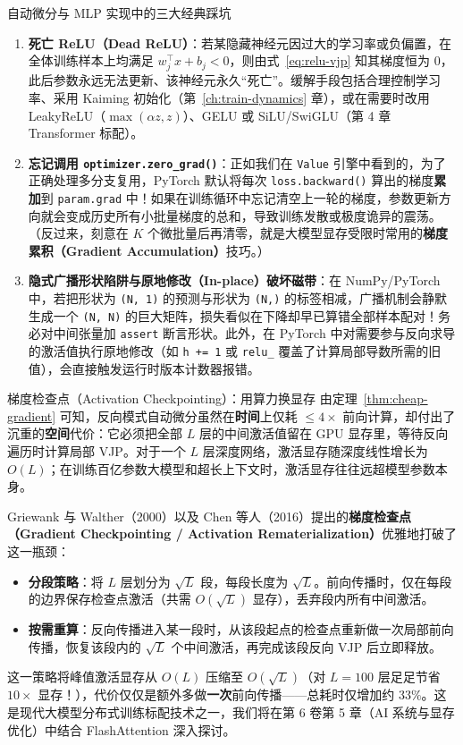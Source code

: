 \begin{failBox}{自动微分与 MLP 实现中的三大经典踩坑}
\begin{enumerate}
  \item \textbf{死亡 ReLU（Dead ReLU）}：若某隐藏神经元因过大的学习率或负偏置，在全体训练样本上均满足 $w_j^\top x + b_j < 0$，则由式~\eqref{eq:relu-vjp} 知其梯度恒为 $0$，此后参数永远无法更新、该神经元永久“死亡”。缓解手段包括合理控制学习率、采用 Kaiming 初始化（第~\ref{ch:train-dynamics} 章），或在需要时改用 LeakyReLU（$\max(\alpha z, z)$）、GELU 或 SiLU/SwiGLU（第 4 章 Transformer 标配）。
  \item \textbf{忘记调用 \texttt{optimizer.zero\_grad()}}：正如我们在 \texttt{Value} 引擎中看到的，为了正确处理多分支复用，PyTorch 默认将每次 \texttt{loss.backward()} 算出的梯度\textbf{累加}到 \texttt{param.grad} 中！如果在训练循环中忘记清空上一轮的梯度，参数更新方向就会变成历史所有小批量梯度的总和，导致训练发散或极度诡异的震荡。（反过来，刻意在 $K$ 个微批量后再清零，就是大模型显存受限时常用的\textbf{梯度累积（Gradient Accumulation）}技巧。）
  \item \textbf{隐式广播形状陷阱与原地修改（In-place）破坏磁带}：在 NumPy/PyTorch 中，若把形状为 \texttt{(N, 1)} 的预测与形状为 \texttt{(N,)} 的标签相减，广播机制会静默生成一个 \texttt{(N, N)} 的巨大矩阵，损失看似在下降却早已算错全部样本配对！务必对中间张量加 \texttt{assert} 断言形状。此外，在 PyTorch 中对需要参与反向求导的激活值执行原地修改（如 \texttt{h += 1} 或 \texttt{relu\_} 覆盖了计算局部导数所需的旧值），会直接触发运行时版本计数器报错。
\end{enumerate}
\end{failBox}

\begin{extBox}{梯度检查点（Activation Checkpointing）：用算力换显存}
由定理~\ref{thm:cheap-gradient} 可知，反向模式自动微分虽然在\textbf{时间}上仅耗 $\le 4\times$ 前向计算，却付出了沉重的\textbf{空间}代价：它必须把全部 $L$ 层的中间激活值留在 GPU 显存里，等待反向遍历时计算局部 VJP。对于一个 $L$ 层深度网络，激活显存随深度线性增长为 $O(L)$；在训练百亿参数大模型和超长上下文时，激活显存往往远超模型参数本身。

Griewank 与 Walther（2000）以及 Chen 等人（2016）提出的\textbf{梯度检查点（Gradient Checkpointing / Activation Rematerialization）}优雅地打破了这一瓶颈：
\begin{itemize}
  \item \textbf{分段策略}：将 $L$ 层划分为 $\sqrt{L}$ 段，每段长度为 $\sqrt{L}$。前向传播时，仅在每段的边界保存检查点激活（共需 $O(\sqrt{L})$ 显存），丢弃段内所有中间激活。
  \item \textbf{按需重算}：反向传播进入某一段时，从该段起点的检查点重新做一次局部前向传播，恢复该段内的 $\sqrt{L}$ 个中间激活，再完成该段反向 VJP 后立即释放。
\end{itemize}
这一策略将峰值激活显存从 $O(L)$ 压缩至 $O(\sqrt{L})$（对 $L=100$ 层足足节省 $10\times$ 显存！），代价仅仅是额外多做\textbf{一次}前向传播——总耗时仅增加约 $33\%$。这是现代大模型分布式训练标配技术之一，我们将在第 6 卷第 5 章（AI 系统与显存优化）中结合 FlashAttention 深入探讨。
\end{extBox}

